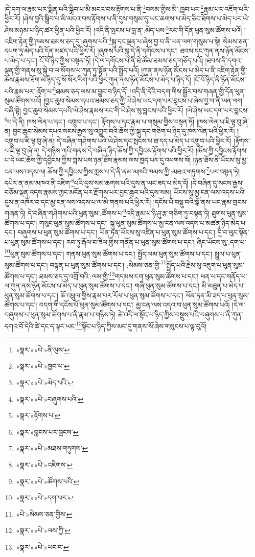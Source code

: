 །དེ་དག་ལ་རྣམ་པར་སྨིན་པའི་སྒྲིབ་པ་མི་མངའ་བས་རྟོགས་པ་ནི་\footnote{«སྣར་»«པེ་»ནི་ལུས་}བསམ་གྱིས་མི་:ཁྱབ་པར་\footnote{«སྣར་»«པེ་»ཁྱབ་པ་}རྣམ་པར་འཇོག་པའི་ཕྱིར་རོ། །ཤེས་བྱའི་སྒྲིབ་པ་མི་མངའ་བས་རྟོགས་པ་ནི་དུས་གསུམ་དུ་ཡང་ཆགས་པ་མེད་ཅིང་ཐོགས་པ་མེད་པར་ཡེ་ཤེས་མཉམ་པ་ཉིད་ཚར་ཕྱིན་པའི་ཕྱིར་རོ། །འདི་ནི་སྤངས་པ་བླ་ན་:མེད་པས་\footnote{«སྣར་»«པེ་»མེད་པའི་}རང་གི་དོན་ཕུན་སུམ་ཚོགས་པའོ། །འཇིག་རྟེན་གྱི་ཁམས་ཐམས་ཅད་དུ་:ཞུགས་པའི་\footnote{«སྣར་»«པེ་»བཞུགས་པའི་}སྐུ་དང་ལྡན་པ་ཞེས་བྱ་བ་ནི་ཡན་ལག་གསུམ་པ་སྟེ། སེམས་ཅན་དཔག་ཏུ་མེད་པའི་དོན་མཛད་པའི་ཕྱིར་རོ། །ཞུགས་པའི་སྐུ་དེ་ནི་དགོངས་པ་དང་། ཐབས་དང་ཀུན་ནས་ཉོན་མོངས་པ་མེད་པ་དང་། ངོ་བོ་ཉིད་ཀྱིས་བསྟན་ཏོ། །དེ་ལ་དགོངས་པ་ནི་ཐེ་ཚོམ་ཐམས་ཅད་གཅོད་པའོ། །ཐབས་ནི་དགའ་ལྡན་གྱི་གནས་སུ་སྐྱེ་བ་ལ་སོགས་པ་ཀུན་ཏུ་སྟོན་པའི་སྤྱོད་པའོ། །ཀུན་ནས་ཉོན་མོངས་པ་མེད་པ་ནི་འཇིག་རྟེན་གྱི་ཆོས་རྣམས་ཐོག་མ་ཉིད་དུ་སོ་སོར་རིག་པའི་ཕྱིར་ཀུན་ནས་ཉོན་མོངས་པ་མེད་པ་ཉིད་དོ། །ངོ་བོ་ཉིད་ནི་ཉོན་མོངས་པའི་རྣམ་པར་:རྟོག་པ་\footnote{«སྣར་»རྟོགས་པ་}ཐམས་ཅད་ལས་མ་བྱུང་བ་ཉིད་དོ། །འདི་ནི་དེའི་བདག་གིས་སྦྱོར་བས་གཞན་གྱི་དོན་ཕུན་སུམ་ཚོགས་པའོ། །བྱང་ཆུབ་སེམས་དཔའ་ཐམས་ཅད་ཀྱི་ཡེ་ཤེས་ཡང་དག་པར་བླངས་པ་ཞེས་བྱ་བ་ནི་ཡན་ལག་བཞི་སྟེ། བྱང་ཆུབ་སེམས་དཔའི་ཡེ་ཤེས་རྣམས་རང་གི་ཡེ་ཤེས་སུ་བླངས་པའི་ཕྱིར་རོ། །ཡེ་ཤེས་ཡང་དག་པར་བླངས་\footnote{«སྣར་»བླངས་པར་བླངས་}པ་དེ་ནི། ཁས་ལེན་པ་དང་། འགྲུབ་པ་དང་། རྟོགས་པ་དང་རྣམ་པ་གསུམ་གྱིས་བསྟན་ཏོ། །ཁས་ལེན་པ་ཇི་ལྟ་བུ་ཞེ་ན། བྱང་ཆུབ་སེམས་དཔའ་སངས་རྒྱས་སུ་འགྱུར་བའི་ཆོས་ཀྱི་སྐུ་དང་གཅིག་པ་ཉིད་དུ་ཁས་ལེན་པའི་ཕྱིར་རོ། །འགྲུབ་པ་ཇི་ལྟ་བུ་ཞེ་ན། དེ་བཞིན་གཤེགས་པའི་ཡེ་ཤེས་དང་སྤངས་པ་ཐ་དད་པ་མེད་པ་འགྲུབ་པའི་ཕྱིར་རོ། །རྟོགས་པ་ཇི་ལྟ་བུ་ཞེ་ན། དེ་གཉིས་ཀའི་གནས་དེ་བཞིན་ཉིད་ཆོས་ཀྱི་དབྱིངས་རྟོགས་པའི་ཕྱིར་རོ། །ཆོས་ཀྱི་དབྱིངས་རྟོགས་པ་དེ་ཡང་ཆོས་ཀྱི་དབྱིངས་ཀྱིས་ཀླས་པས་ཉན་ཐོས་རྣམས་ལས་ཁྱད་པར་དུ་འཕགས་སོ། །ཉན་ཐོས་ནི་ཡོངས་སུ་མྱ་ངན་ལས་འདས་ལ། ཆོས་ཀྱི་དབྱིངས་ཀྱིས་ཀླས་པ་དེ་ནི་ནམ་མཁའི་ཁམས་ཀྱི་:མཐའ་གཏུགས་\footnote{«སྣར་»«པེ་»མཐས་གཏུགས་}པར་བསྟན་ཏེ། དཔེར་ན་ནམ་མཁའ་ནི་འཇིག་\footnote{«སྣར་»«པེ་»འཇིགས་}པའི་དུས་སམ་ཆགས་པའི་དུས་ན་ཡང་ཟད་པ་མེད་དོ། །དེ་བཞིན་དུ་སངས་རྒྱས་བཅོམ་ལྡན་འདས་རྣམས་ཀྱང་མངོན་པར་རྫོགས་པར་བྱང་ཆུབ་པའི་དུས་སམ། ཡོངས་སུ་མྱ་ངན་ལས་འདས་པའི་དུས་ན་འཁོར་བ་དང་མྱ་ངན་ལས་འདས་པ་ལ་མི་གནས་པའི་ཕྱིར་རོ། །དངོས་པོ་བསྡུ་བའི་སྒོ་ནས་ཡང་རྣམ་གྲངས་གཞན་ཏེ། དེ་བཞིན་གཤེགས་པའི་ཕུན་སུམ་:ཚོགས་པ་\footnote{«སྣར་»«པེ་»ཚོགས་པའི་}འདི་རྣམ་པ་ཉི་ཤུ་རྩ་གཅིག་ཏུ་བསྟན་ཏེ། ཐུགས་ཕུན་སུམ་ཚོགས་པ་དང་། གསུང་ཕུན་སུམ་ཚོགས་པ་དང་། སྐུ་ཕུན་སུམ་ཚོགས་པ་མྱ་ངན་ལས་འདས་པ་མཚན་ཉིད་མེད་པ་དང་། བཞུགས་པ་ཕུན་སུམ་ཚོགས་པ་དང་། ཡོན་ཏན་ཡོངས་སུ་འཛིན་པ་ཕུན་སུམ་ཚོགས་པ་དང་། དྲི་བ་ལུང་སྟོན་པ་ཕུན་སུམ་ཚོགས་པ་དང་། རབ་ཏུ་རྒོལ་བ་ཟིལ་གྱིས་གནོན་པ་ཕུན་སུམ་ཚོགས་པ་དང་། ཞིང་ཡོངས་སུ་:དག་པ་\footnote{«སྣར་»«པེ་»དག་པར་}ཕུན་སུམ་ཚོགས་པ་དང་། གནས་ཕུན་སུམ་ཚོགས་པ་དང་། སྤྱོད་ལམ་ཕུན་སུམ་ཚོགས་པ་དང་། སྤྲུལ་པ་ཕུན་སུམ་ཚོགས་པ་དང་། བསྟན་པ་ཕུན་སུམ་ཚོགས་པ་དང་། :སེམས་ཅན་གྱི་\footnote{«པེ་»སེམས་ཅན་གྱིས་}སྤྱོད་པའི་རྗེས་སུ་འཇུག་པ་ཕུན་སུམ་ཚོགས་པ་དང་། ཐམས་ཅད་དུ་འགྲོ་བའི་:ལམ་གྱི་\footnote{«སྣར་»«པེ་»ལས་ཀྱི་}གདམས་ངག་ཕུན་སུམ་ཚོགས་པ་དང་། ཕན་པ་དང་གནོད་པ་ལ་ཀུན་ནས་ཉོན་མོངས་པ་མེད་པ་ཕུན་སུམ་ཚོགས་པ་དང་། གཞི་ཕུན་སུམ་ཚོགས་པ་དང་། མི་མཐུན་པ་མེད་པ་ཕུན་སུམ་ཚོགས་པ་དང་། ཆོ་འཕྲུལ་གྱིས་རྣམ་པར་རོལ་པ་ཕུན་སུམ་ཚོགས་པ་དང་། ཡོན་ཏན་མི་ཟད་པ་ཕུན་སུམ་ཚོགས་པ་དང་། བདག་གི་དངོས་པོ་ཕུན་སུམ་ཚོགས་པ་དང་། མྱ་ངན་ལས་འདའ་བ་ཕུན་སུམ་ཚོགས་པའོ། །དེ་ལ་བཞུགས་པ་ཕུན་སུམ་ཚོགས་པ་ནི་རྣམ་པ་གཉིས་ཏེ། ཚེ་འདི་ལ་སྟོང་པ་ཉིད་ཀྱིས་བསྡུས་པའི་བཞུགས་པ་ནི་ཀུན་དགའ་བོ་དེའི་ཚེ་དང་ད་ལྟར་ཡང་\footnote{«སྣར་»«པེ་»ཡང་ང་}སྟོང་པ་ཉིད་ཀྱིས་མང་དུ་གནས་སོ་ཞེས་གསུངས་པ་ལྟ་བུའོ། 